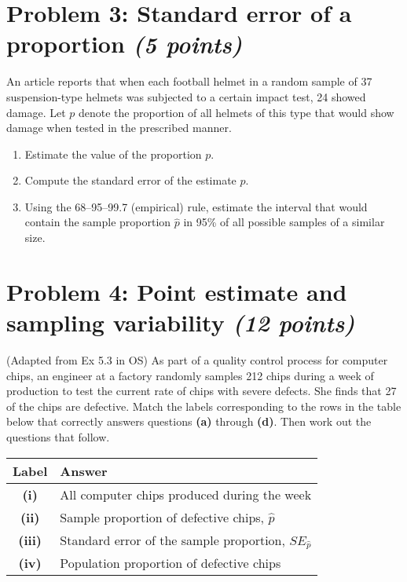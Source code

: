 \documentclass[11pt,twoside]{article}
\newcommand{\pts}[1]{\marginpar{ \small\hspace{0pt} \textit{[#1]} } }
\numberwithin{equation}{section}
\newcommand{\?}{\stackrel{?}{=}}
\begin{document}
\eject

\section*{Problem 3: Standard error of a proportion  \textit{(5 points)}}
An article reports that when each football helmet in a random sample of 37 suspension-type helmets was subjected to a
certain impact test, 24 showed damage. Let $p$ denote the proportion of all helmets of this type that would show damage
when tested in the prescribed manner.

\begin{enumerate}[\bf (a)]
\item  Estimate the value of the proportion $p$. \pts{1}
  \vspace{30ex}
 
\item Compute the standard error of the estimate $\hat p$.\pts{2}
  \vspace{30ex}

\item Using the 68–95–99.7 (empirical) rule, estimate the interval that would contain the sample proportion
  $\hat p$ in 95\% of all possible samples of a similar size. \pts{2}
 \end{enumerate}

\eject

\section*{Problem 4: Point estimate and sampling variability  \textit{(12 points)}}
(Adapted from Ex 5.3 in OS) As part of a quality control process for computer chips, an engineer at a factory
randomly samples 212 chips during a week of production to test the current rate of chips with severe defects.
She finds that 27 of the chips are defective. Match the labels corresponding to the rows in the table below that correctly answers  questions \textbf{(a)} through \textbf{(d)}. Then work out the questions that follow.

\begin{center}
  \small
\begin{tabular}{c l}\toprule
  \bf Label & \bf Answer \\\midrule
  \bf (i)  & All computer chips produced during the week \\
  \bf (ii) & Sample proportion of defective chips, $\hat p$ \\
  \bf (iii)& Standard error of the sample proportion, $SE_{\hat p}$ \\
  \bf (iv)  & Population proportion of defective chips\\\bottomrule
\end{tabular}
\end{center}
\end{document}

